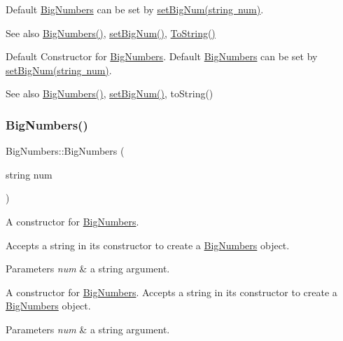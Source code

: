 Default \mbox{\hyperlink{class_big_numbers}{Big\+Numbers}} can be set by \mbox{\hyperlink{class_big_numbers_acc7490767828ba1addc49d07a5be3757}{set\+Big\+Num(string num)}}. \begin{DoxySeeAlso}{See also}
\mbox{\hyperlink{class_big_numbers_af3dd82883f10f3473ac83280f26b0ad8}{Big\+Numbers()}}, \mbox{\hyperlink{class_big_numbers_acc7490767828ba1addc49d07a5be3757}{set\+Big\+Num()}}, \mbox{\hyperlink{class_big_numbers_a326c5e36f8b346e85050909536a1a666}{To\+String()}}
\end{DoxySeeAlso}
Default Constructor for \mbox{\hyperlink{class_big_numbers}{Big\+Numbers}}. Default \mbox{\hyperlink{class_big_numbers}{Big\+Numbers}} can be set by \mbox{\hyperlink{class_big_numbers_acc7490767828ba1addc49d07a5be3757}{set\+Big\+Num(string num)}}. \begin{DoxySeeAlso}{See also}
\mbox{\hyperlink{class_big_numbers_af3dd82883f10f3473ac83280f26b0ad8}{Big\+Numbers()}}, \mbox{\hyperlink{class_big_numbers_acc7490767828ba1addc49d07a5be3757}{set\+Big\+Num()}}, to\+String() 
\end{DoxySeeAlso}
\mbox{\label{class_big_numbers_a9052f67b5cdbab8a22310d9133fe1bb5}} 
\subsubsection{\texorpdfstring{Big\+Numbers()}{BigNumbers()}\hspace{0.1cm}{\footnotesize\ttfamily [2/2]}}
{\footnotesize\ttfamily Big\+Numbers\+::\+Big\+Numbers (\begin{DoxyParamCaption}\item[{string}]{num }\end{DoxyParamCaption})}



A constructor for \mbox{\hyperlink{class_big_numbers}{Big\+Numbers}}. 

Accepts a string in its constructor to create a \mbox{\hyperlink{class_big_numbers}{Big\+Numbers}} object. 
\begin{DoxyParams}{Parameters}
{\em num} & a string argument.\\
\hline
\end{DoxyParams}
A constructor for \mbox{\hyperlink{class_big_numbers}{Big\+Numbers}}. Accepts a string in its constructor to create a \mbox{\hyperlink{class_big_numbers}{Big\+Numbers}} object. 
\begin{DoxyParams}{Parameters}
{\em num} & a string argument. \\
\hline
\end{DoxyParams}



